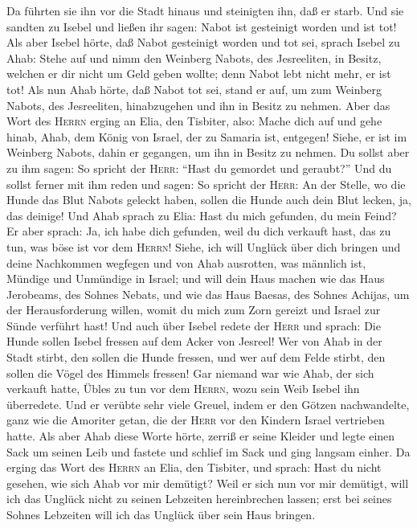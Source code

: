 Da führten sie ihn vor die Stadt hinaus und steinigten ihn, daß er
starb.  Und sie sandten zu Isebel und ließen ihr sagen:
Nabot ist gesteinigt worden und ist tot!  Als aber Isebel
hörte, daß Nabot gesteinigt worden und tot sei, sprach Isebel zu Ahab:
Stehe auf und nimm den Weinberg Nabots, des Jesreeliten, in Besitz,
welchen er dir nicht um Geld geben wollte; denn Nabot lebt nicht mehr,
er ist tot!  Als nun Ahab hörte, daß Nabot tot sei, stand
er auf, um zum Weinberg Nabots, des Jesreeliten, hinabzugehen und ihn in
Besitz zu nehmen.  Aber das Wort des \textsc{Herrn}
erging an Elia, den Tisbiter, also:  Mache dich auf und
gehe hinab, Ahab, dem König von Israel, der zu Samaria ist, entgegen!
Siehe, er ist im Weinberg Nabots, dahin er gegangen, um ihn in Besitz zu
nehmen.  Du sollst aber zu ihm sagen: So spricht der
\textsc{Herr}: ``Hast du gemordet und geraubt?'' Und du sollst ferner
mit ihm reden und sagen: So spricht der \textsc{Herr}: An der Stelle, wo
die Hunde das Blut Nabots geleckt haben, sollen die Hunde auch dein Blut
lecken, ja, das deinige!  Und Ahab sprach zu Elia: Hast
du mich gefunden, du mein Feind? Er aber sprach: Ja, ich habe dich
gefunden, weil du dich verkauft hast, das zu tun, was böse ist vor dem
\textsc{Herrn}!  Siehe, ich will Unglück über dich
bringen und deine Nachkommen wegfegen und von Ahab ausrotten, was
männlich ist, Mündige und Unmündige in Israel;  und will
dein Haus machen wie das Haus Jerobeams, des Sohnes Nebats, und wie das
Haus Baesas, des Sohnes Achijas, um der Herausforderung willen, womit du
mich zum Zorn gereizt und Israel zur Sünde verführt hast!
 Und auch über Isebel redete der \textsc{Herr} und
sprach: Die Hunde sollen Isebel fressen auf dem Acker von Jesreel!
 Wer von Ahab in der Stadt stirbt, den sollen die Hunde
fressen, und wer auf dem Felde stirbt, den sollen die Vögel des Himmels
fressen!  Gar niemand war wie Ahab, der sich verkauft
hatte, Übles zu tun vor dem \textsc{Herrn}, wozu sein Weib Isebel ihn
überredete.  Und er verübte sehr viele Greuel, indem er
den Götzen nachwandelte, ganz wie die Amoriter getan, die der
\textsc{Herr} vor den Kindern Israel vertrieben hatte. 
Als aber Ahab diese Worte hörte, zerriß er seine Kleider und legte einen
Sack um seinen Leib und fastete und schlief im Sack und ging langsam
einher.  Da erging das Wort des \textsc{Herrn} an Elia,
den Tisbiter, und sprach:  Hast du nicht gesehen, wie
sich Ahab vor mir demütigt? Weil er sich nun vor mir demütigt, will ich
das Unglück nicht zu seinen Lebzeiten hereinbrechen lassen; erst bei
seines Sohnes Lebzeiten will ich das Unglück über sein Haus bringen.


